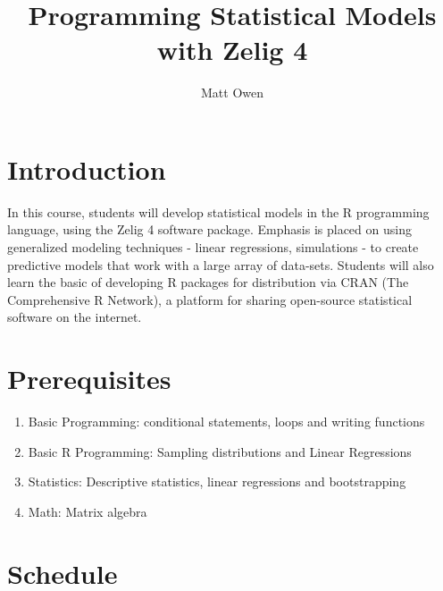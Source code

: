 \documentclass{article}
\title{Programming Statistical Models with Zelig 4}
\author{Matt Owen}
\begin{document}
\maketitle


%
\section{Introduction}
\label{intro}

In this course, students will develop statistical models in the R programming 
language, using the Zelig 4 software package. Emphasis is placed on using 
generalized modeling techniques - linear regressions, simulations - to create 
predictive models that work with a large array of data-sets. Students will also 
learn the basic of developing R packages for distribution via CRAN 
(The Comprehensive R Network), a platform for sharing open-source statistical 
software on the internet.


%
\section{Prerequisites}
\label{prereq}

\begin{enumerate}
  \item Basic Programming: conditional statements, loops and writing functions
  \item Basic R Programming: Sampling distributions and Linear Regressions
  \item Statistics: Descriptive statistics, linear regressions and bootstrapping
  \item Math: Matrix algebra
\end{enumerate}


%
\section{Schedule}
\label{schedule}
\end{document}
